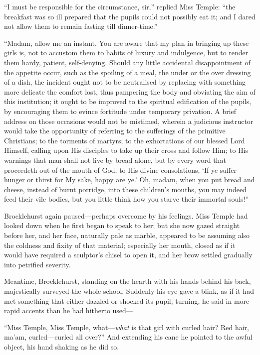 \enquote{I must be responsible for the circumstance, sir,} replied Miss
Temple: \enquote{the breakfast was so ill prepared that the pupils could
	not possibly eat it; and I dared not allow them to remain fasting till
	dinner-time.}

\enquote{Madam, allow me an instant. You are aware that my plan in
	bringing up these girls is, not to accustom them to habits of luxury and
	indulgence, but to render them hardy, patient, self-denying. Should any
	little accidental disappointment of the appetite occur, such as the
	spoiling of a meal, the under or the over dressing of a dish, the
	incident ought not to be neutralised by replacing with something more
	delicate the comfort lost, thus pampering the body and obviating the aim
	of this institution; it ought to be improved to the spiritual
	edification of the pupils, by encouraging them to evince fortitude under
	temporary privation. A brief address on those occasions would not be
	mistimed, wherein a judicious instructor would take the opportunity of
	referring to the sufferings of the primitive Christians; to the torments
	of martyrs; to the exhortations of our blessed Lord Himself, calling
	upon His disciples to take up their cross and follow Him; to His
	warnings that man shall not live by bread alone, but by every word that
	proceedeth out of the mouth of God; to His divine consolations, \enquote{If ye
		suffer hunger or thirst for My sake, happy are ye.} Oh, madam, when you
	put bread and cheese, instead of burnt porridge, into these children's
	mouths, you may indeed feed their vile bodies, but you little think how
	you starve their immortal souls!}

\Mr{} Brocklehurst again paused---perhaps overcome by his feelings. Miss
Temple had looked down when he first began to speak to her; but she now
gazed straight before her, and her face, naturally pale as marble,
appeared to be assuming also the coldness and fixity of that material;
especially her mouth, closed as if it would have required a sculptor's
chisel to open it, and her brow settled gradually into petrified
severity.

Meantime, \Mr{} Brocklehurst, standing on the hearth with his hands behind
his back, majestically surveyed the whole school. Suddenly his eye gave
a blink, as if it had met something that either dazzled or shocked its
pupil; turning, he said in more rapid accents than he had hitherto
used---

\enquote{Miss Temple, Miss Temple, what---\emph{what} is that girl with curled
	hair? Red hair, ma'am, curled---curled all over?} And extending his
cane he pointed to the awful object, his hand shaking as he did so.

